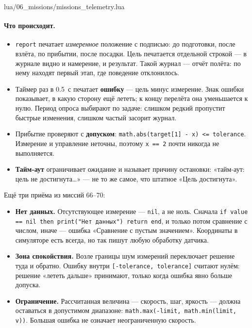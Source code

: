 \begin{codefile}{lua/06_missions/missions_telemetry.lua}
\end{codefile}

\paragraph{Что происходит.}
\begin{itemize}
    \item \verb|report| печатает \emph{измеренное} положение с подписью: до подготовки, после взлёта, по прибытии, после посадки. Цель печатается отдельной строкой --- в журнале видно и намерение, и результат. Такой журнал --- отчёт полёта: по нему находят первый этап, где поведение отклонилось.
    \item Таймер раз в 0.5~с печатает \textbf{ошибку} --- цель минус измерение. Знак ошибки показывает, в какую сторону ещё лететь; к концу перелёта она уменьшается к нулю. Период опроса выбирают по задаче: слишком редкий пропустит быстрые изменения, слишком частый засорит журнал.
    \item Прибытие проверяют с \textbf{допуском}: \texttt{math.abs(target[1] - x) <= tolerance}. Измерение и управление неточны, поэтому \verb|x == 2| почти никогда не выполняется.
    \item \textbf{Тайм-аут} ограничивает ожидание и называет причину остановки: «тайм-аут: цель не достигнута\dots» --- не то же самое, что штатное «Цель достигнута».
\end{itemize}

Ещё три приёма из миссий 66--70:
\begin{itemize}
    \item \textbf{Нет данных.} Отсутствующее измерение --- \verb|nil|, а не ноль. Сначала \verb|if value == nil then print("Нет данных") return end|, и только потом сравнение с числом, иначе --- ошибка «Сравнение с пустым значением». Координаты в симуляторе есть всегда, но так пишут любую обработку датчика.
    \item \textbf{Зона спокойствия.} Возле границы шум измерений переключает решение туда и обратно. Ошибку внутри \verb|[-tolerance, tolerance]| считают нулём: решение «лететь дальше» принимают, только когда ошибка явно больше допуска.
    \item \textbf{Ограничение.} Рассчитанная величина --- скорость, шаг, яркость --- должна оставаться в допустимом диапазоне: \verb|math.max(-limit, math.min(limit, v))|. Большая ошибка не означает неограниченную скорость.
\end{itemize}

